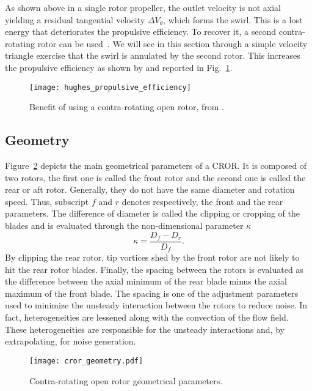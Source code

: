
As shown above in a single rotor propeller, the outlet velocity is not axial
yielding a residual tangential velocity $\Delta V_{\theta}$,
which forms the swirl. 
This is a lost energy that deteriorates the propulsive efficiency. 
To recover it, a second contra-rotating rotor can be used~\cite{Hager1988}.
We will see in this section through a simple velocity triangle exercise that
the swirl is annulated by the second rotor. This increases the propulsive
efficiency as shown by \citet{Hughes1989} and reported 
in Fig.~\ref{fig:hughes_propulsive_efficiency}.
\begin{figure}[htp]
  \centering
  \texttt{[image: hughes\_propulsive\_efficiency]}
  \caption{Benefit of using a contra-rotating open rotor, from \citet{Hughes1989}.}
  \label{fig:hughes_propulsive_efficiency}
\end{figure}

\subsection{Geometry}
\label{sub:cror_geometry}

Figure~\ref{fig:cror_geometry} depicts the main
geometrical parameters of a CROR.
It is composed of two rotors, the first one is called
the front rotor and the second one is called the rear or aft rotor.
Generally, they do not have the same diameter and rotation speed. 
Thus, subscript $f$ and $r$ denotes respectively,
the front and the rear parameters.
The difference of diameter is called the clipping or cropping
of the blades and is evaluated through the non-dimensional parameter
$\kappa$
\begin{equation}
    \kappa = \frac{D_f - D_r}{D_f}.
\end{equation}
By clipping the rear
rotor, tip vortices shed by the front rotor are not likely
to hit the rear rotor blades.
Finally, the spacing between the rotors
is evaluated as the difference between the axial minimum of the
rear blade minus the axial maximum of the front blade. The spacing
is one of the adjustment parameters used to minimize the unsteady
interaction between the rotors to reduce noise. In fact, 
heterogeneities are lessened along with the convection of
the flow field. These heterogeneities are responsible
for the unsteady interactions and, by extrapolating, for noise generation.
\begin{figure}[htp]
  \centering
  \texttt{[image: cror\_geometry.pdf]}
  \caption{Contra-rotating open rotor geometrical parameters.}
  \label{fig:cror_geometry}
\end{figure}

